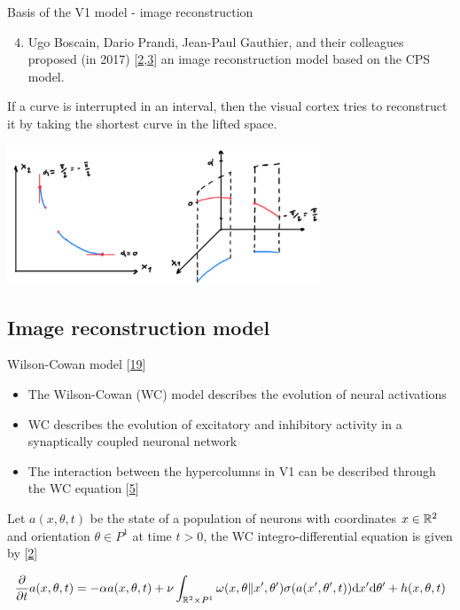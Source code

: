 \documentclass[10pt,american,ignorenonframetext,aspectratio=1610]{beamer}
\providecommand{\tightlist}{%
  \setlength{\itemsep}{0pt}\setlength{\parskip}{0pt}}
\theoremstyle{remark}
\begin{document}
\begin{frame}{Basis of the V1 model - image reconstruction}
\protect\hypertarget{basis-of-the-v1-model---image-reconstruction}{}

\begin{enumerate}
\setcounter{enumi}{3}
\tightlist
\item
  Ugo Boscain, Dario Prandi, Jean-Paul Gauthier, and their colleagues
  proposed (in 2017)
  {[}\protect\hyperlink{ref-bertalmio2018}{2},\protect\hyperlink{ref-boscain2017}{3}{]}
  an image reconstruction model based on the CPS model.
\end{enumerate}

If a curve is interrupted in an interval, then the visual cortex tries
to reconstruct it by taking the shortest curve in the lifted space.

\includegraphics[width=0.7\textwidth,height=\textheight]{img/v1_model_2.jpg}

\end{frame}

\hypertarget{image-reconstruction-model-1}{%
\subsection{Image reconstruction
model}\label{image-reconstruction-model-1}}

\begin{frame}{Wilson-Cowan model
{[}\protect\hyperlink{ref-wilson1972}{19}{]}}
\protect\hypertarget{wilson-cowan-model-wilson1972}{}

\begin{itemize}
\tightlist
\item
  The Wilson-Cowan (WC) model describes the evolution of neural
  activations
\item
  WC describes the evolution of excitatory and inhibitory activity in a
  synaptically coupled neuronal network
\item
  The interaction between the hypercolumns in V1 can be described
  through the WC equation {[}\protect\hyperlink{ref-bressloff2002}{5}{]}
\end{itemize}

Let \(a(x,\theta,t)\) be the state of a population of neurons with
coordinates \(x\in\mathbb{R}^2\) and orientation \(\theta\in P^1\) at time
\(t>0\), the WC integro-differential equation is given by
{[}\protect\hyperlink{ref-bertalmio2018}{2}{]}

\[ \frac{\partial}{\partial t} a(x,\theta,t) = -\alpha a(x,\theta,t) + \nu
\int_{\mathbb{R}^2\times P^1} \omega(x,\theta\| x',\theta') \sigma(a(x',\theta',t)) \mathrm{d}x'\mathrm{d}\theta'
+ h(x,\theta,t) \]

\end{frame}
\end{document}
